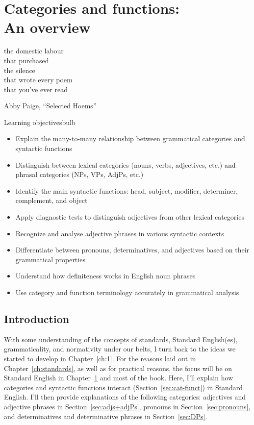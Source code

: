 \chapter{Categories and functions: \\An overview} \label{ch:categories}

\epigraph{the domestic labour\\
that purchased\\
the silence\\
that wrote every poem\\
that you've ever read}{Abby Paige, \enquote{Selected Hoems} \citep{Paige2020SelectedHoems}}

\begin{tblsframedsymbol}{Learning objectives}{bulb}
\begin{itemize}[noitemsep, leftmargin=*]
    \item Explain the many-to-many relationship between grammatical categories and syntactic functions
    \item Distinguish between lexical categories (nouns, verbs, adjectives, etc.) and phrasal categories (NPs, VPs, AdjPs, etc.)
    \item Identify the main syntactic functions: head, subject, modifier, determiner, complement, and object
    \item Apply diagnostic tests to distinguish adjectives from other lexical categories
    \item Recognize and analyse adjective phrases in various syntactic contexts
    \item Differentiate between pronouns, determinatives, and adjectives based on their grammatical properties
    \item Understand how definiteness works in English noun phrases
    \item Use category and function terminology accurately in grammatical analysis
\end{itemize}
\end{tblsframedsymbol}

\section{Introduction}
With some understanding of the concepts of standards, Standard English(es), grammaticality, and normativity under our belts, I turn back to the ideas we started to develop in Chapter~\ref{ch:1}. For the reasons laid out in Chapter~\ref{ch:standards}, as well as for practical reasons, the focus will be on Standard English in Chapter~\ref{ch:categories} and most of the book. Here, I'll explain how categories and syntactic functions interact (Section~\ref{sec:cat-funct}) in Standard English. I'll then provide explanations of the following categories: adjectives and adjective phrases in Section~\ref{sec:adjs+adjPs}, pronouns in Section~\ref{sec:pronouns}, and determinatives and determinative phrases in Section~\ref{sec:DPs}.

